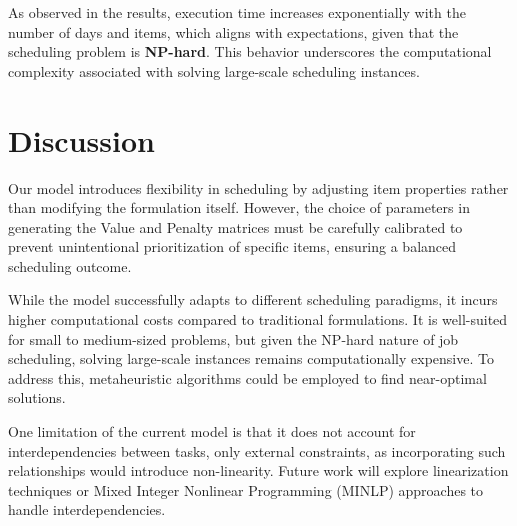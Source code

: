 \documentclass[12pt]{article}
\begin{document}
As observed in the results, execution time increases exponentially with the number of days and items, which aligns with expectations, given that the scheduling problem is \textbf{NP-hard}. This behavior underscores the computational complexity associated with solving large-scale scheduling instances.





\section*{Discussion}

Our model introduces flexibility in scheduling by adjusting item properties rather than modifying the formulation itself. However, the choice of parameters in generating the Value and Penalty matrices must be carefully calibrated to prevent unintentional prioritization of specific items, ensuring a balanced scheduling outcome.

While the model successfully adapts to different scheduling paradigms, it incurs higher computational costs compared to traditional formulations. It is well-suited for small to medium-sized problems, but given the NP-hard nature of job scheduling, solving large-scale instances remains computationally expensive. To address this, metaheuristic algorithms could be employed to find near-optimal solutions.

One limitation of the current model is that it does not account for interdependencies between tasks, only external constraints, as incorporating such relationships would introduce non-linearity. Future work will explore linearization techniques or Mixed Integer Nonlinear Programming (MINLP) approaches to handle interdependencies.
\end{document}
